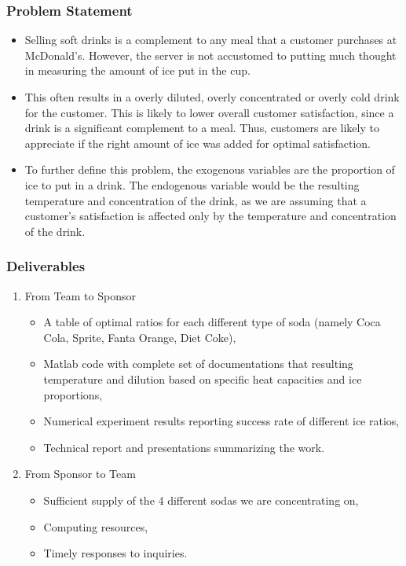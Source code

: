 \documentclass[compress,handout,10pt]{beamer}
\let\olditem\item
\renewcommand{\item}{\setlength{\itemsep}{0.5\baselineskip}\olditem}
\begin{document}
\begin{frame}
    \frametitle{Problem Statement}
     \begin{itemize}
         \item Selling soft drinks is a complement to any meal that a customer purchases at McDonald's. However, the server is not accustomed to putting much thought in measuring the amount of ice put in the cup.
\item This often results in a overly diluted, overly concentrated or overly cold drink for the customer. This is likely to lower overall customer satisfaction, since a drink is a significant complement to a meal. Thus, customers are likely to appreciate if the right amount of ice was added for optimal satisfaction.
\item To further define this problem, the exogenous variables are the proportion of ice to put in a drink. The endogenous variable would be the resulting temperature and concentration of the drink, as we are assuming that a customer's satisfaction is affected only by the temperature and concentration of the drink.
     \end{itemize}
\end{frame}


\begin{frame}
    \frametitle{Deliverables}
\begin{enumerate}
 \item From Team to Sponsor
\begin{itemize}
    \item A table of optimal ratios for each different type of soda (namely Coca Cola, Sprite, Fanta Orange, Diet Coke),
    \item Matlab code with complete set of documentations that resulting temperature and dilution based on specific heat capacities and ice proportions,
    \item Numerical experiment results reporting success rate of different ice ratios,
    \item Technical report and presentations summarizing the work. 
\end{itemize}

\item From Sponsor to Team
\begin{itemize}
    \item Sufficient supply of the 4 different sodas we are concentrating on,
    \item Computing resources,
    \item Timely responses to inquiries.
\end{itemize}
\end{enumerate}
\end{frame}
\end{document}
